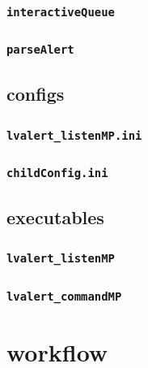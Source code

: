 \documentclass{article}
\newcommand{\lvalertListenMP}{\texttt{lvalert\_listenMP}~}
\newcommand{\lvalertCommandMP}{\texttt{lvalert\_commandMP}~}
\newcommand{\interactiveQueue}{\texttt{interactiveQueue}~}
\newcommand{\parseAlert}{\texttt{parseAlert}~}
\newcommand{\lvalertMPini}{\texttt{lvalert\_listenMP.ini}~}
\newcommand{\childConfigini}{\texttt{childConfig.ini}~}
\begin{document}
\subsubsection{\interactiveQueue}

\subsubsection{\parseAlert}


\subsection{configs}

\subsubsection{\lvalertMPini}

\subsubsection{\childConfigini}


\subsection{executables}

\subsubsection{\lvalertListenMP}

\subsubsection{\lvalertCommandMP}


\section{workflow}
\end{document}
